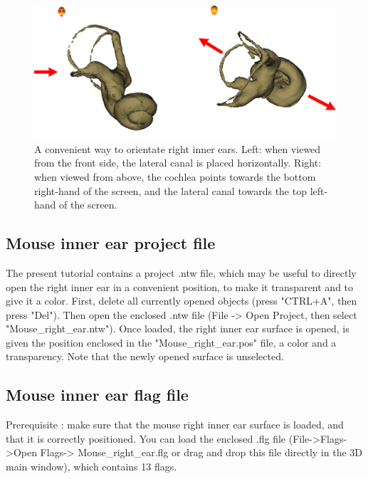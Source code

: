 \documentclass[12pt, a4paper]{book}
\begin{document}
\begin{figure}
  \centering
  \includegraphics[scale=0.3]{pos.png} 
	\caption{A convenient way to orientate right inner ears.  Left: when viewed from the front side, the lateral canal is placed horizontally. Right: when viewed from above, the cochlea points towards the bottom right-hand of the screen, and the lateral canal towards the top left-hand of the screen.}
\label{orientation}
 
\end{figure}

\subsection{Mouse inner ear project file}
The present tutorial contains a project .ntw file, which may be useful to directly open the right inner ear
 in a convenient position, to make it transparent and to give it a color. First, delete all currently opened objects
(press "CTRL+A", then press "Del"). Then open the enclosed .ntw file (File -> Open Project, then select
"Mouse\_right\_ear.ntw"). Once loaded, the right inner ear surface is opened, is given the position
enclosed in the "Mouse\_right\_ear.pos" file, a color and a transparency. Note that the newly opened
surface is unselected.\\


\subsection{Mouse inner ear flag file}
Prerequisite : make sure that the mouse right inner ear surface is loaded, and that it is correctly positioned. 
You can load the enclosed .flg file (File->Flags->Open Flags-> Mouse\_right\_ear.flg or drag and drop this file directly in the 3D main window), which contains 13 flags.   
\end{document}
